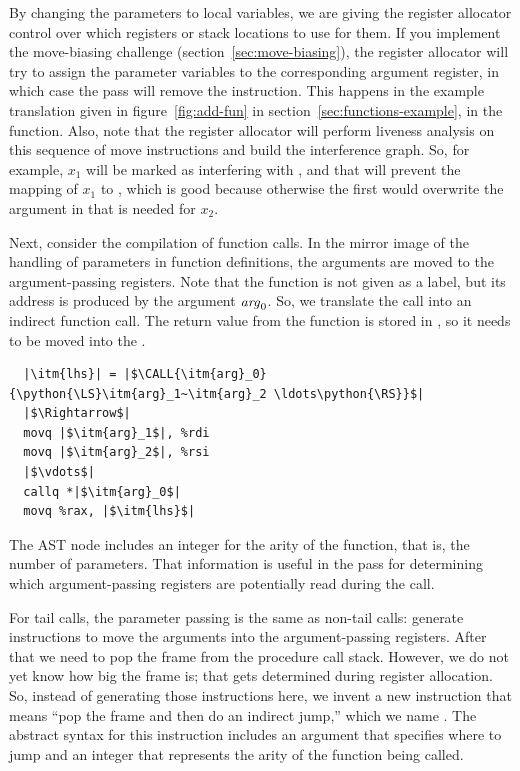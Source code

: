 \documentclass[7x10]{TimesAPriori_MIT}%
\def\pythonEd{1}
\def\edition{1}
\newcommand{\pythonColor}[0]{}
\newcommand{\python}[1]{{\if\edition\pythonEd\pythonColor #1\fi}}
\numberwithin{theorem}{chapter}
\numberwithin{definition}{chapter}
\numberwithin{equation}{chapter}
\begin{document}
By changing the parameters to local variables, we are giving the
register allocator control over which registers or stack locations to
use for them. If you implement the move-biasing challenge
(section~\ref{sec:move-biasing}), the register allocator will try to
assign the parameter variables to the corresponding argument register,
in which case the  pass will remove the
 instruction. This happens in the example translation given
in figure~\ref{fig:add-fun} in section~\ref{sec:functions-example}, in
the  function.
%
Also, note that the register allocator will perform liveness analysis
on this sequence of move instructions and build the interference
graph. So, for example, $x_1$ will be marked as interfering with
, and that will prevent the mapping of $x_1$ to ,
which is good because otherwise the first  would overwrite
the argument in  that is needed for $x_2$.

Next, consider the compilation of function calls. In the mirror image
of the handling of parameters in function definitions, the arguments
are moved to the argument-passing registers.  Note that the function
is not given as a label, but its address is produced by the argument
$\mathit{arg}_0$. So, we translate the call into an indirect function
call. The return value from the function is stored in , so
it needs to be moved into the .
\begin{lstlisting}
  |\itm{lhs}| = |$\CALL{\itm{arg}_0}{\python{\LS}\itm{arg}_1~\itm{arg}_2 \ldots\python{\RS}}$|
  |$\Rightarrow$|
  movq |$\itm{arg}_1$|, %rdi
  movq |$\itm{arg}_2$|, %rsi
  |$\vdots$|
  callq *|$\itm{arg}_0$|
  movq %rax, |$\itm{lhs}$|
\end{lstlisting}
The  AST node includes an integer for the arity of
the function, that is, the number of parameters. That information is
useful in the  pass for determining which
argument-passing registers are potentially read during the call.

For tail calls, the parameter passing is the same as non-tail calls:
generate instructions to move the arguments into the argument-passing
registers.  After that we need to pop the frame from the procedure
call stack.  However, we do not yet know how big the frame is; that
gets determined during register allocation. So, instead of generating
those instructions here, we invent a new instruction that means ``pop
the frame and then do an indirect jump,'' which we name
. The abstract syntax for this instruction includes an
argument that specifies where to jump and an integer that represents
the arity of the function being called.
\end{document}
